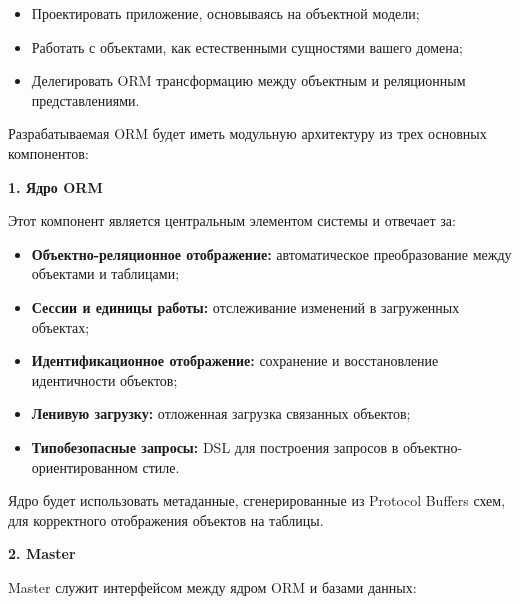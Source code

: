         \begin{itemize}
            \item Проектировать приложение, основываясь на объектной модели;
            \item Работать с объектами, как естественными сущностями вашего домена;
            \item Делегировать ORM трансформацию между объектным и реляционным представлениями.
        \end{itemize}

    
        Разрабатываемая ORM будет иметь модульную архитектуру из трех основных компонентов:
        
        \textbf{1. Ядро ORM}
        
            Этот компонент является центральным элементом системы и отвечает за:
            
            \begin{itemize}
                \item \textbf{Объектно-реляционное отображение:} автоматическое преобразование между объектами и таблицами;
                
                \item \textbf{Сессии и единицы работы:} отслеживание изменений в загруженных объектах;
                
                \item \textbf{Идентификационное отображение:} сохранение и восстановление идентичности объектов;
                
                \item \textbf{Ленивую загрузку:} отложенная загрузка связанных объектов;
                
                \item \textbf{Типобезопасные запросы:} DSL для построения запросов в объектно-ориентированном стиле.
            \end{itemize}
            
            Ядро будет использовать метаданные, сгенерированные из Protocol Buffers схем, для корректного отображения объектов на таблицы.
        
        \textbf{2. Master}
        
            Master служит интерфейсом между ядром ORM и базами данных:
            
